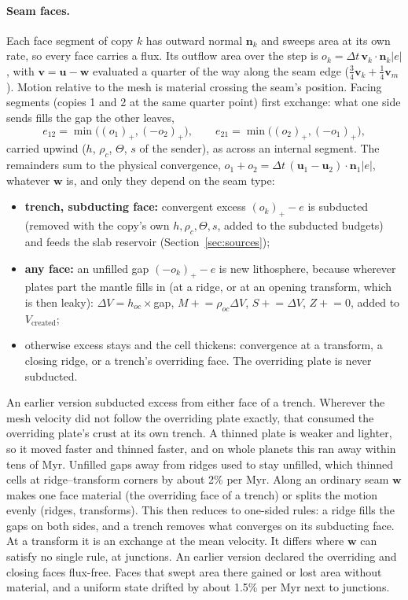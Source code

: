 \documentclass[11pt]{article}
\newcommand{\vect}[1]{\mathbf{#1}}
\begin{document}
\paragraph{Seam faces.} Each face segment of copy $k$ has outward normal $\vect{n}_k$ and sweeps area at its own rate, so every face carries a flux. Its outflow area over the step is $o_k=\Delta t\,\vect{v}_k\cdot\vect{n}_k|e|$, with $\vect{v}=\vect{u}-\vect{w}$ evaluated a quarter of the way along the seam edge ($\tfrac34\vect{v}_k+\tfrac14\vect{v}_m$). Motion relative to the mesh is material crossing the seam's position. Facing segments (copies 1 and 2 at the same quarter point) first exchange: what one side sends fills the gap the other leaves,
\begin{equation}
  e_{12}=\min\big((o_1)_+,(-o_2)_+\big),\qquad e_{21}=\min\big((o_2)_+,(-o_1)_+\big),
\end{equation}
carried upwind ($h$, $\rho_c$, $\Theta$, $s$ of the sender), as across an internal segment. The remainders sum to the physical convergence, $o_1+o_2=\Delta t\,(\vect{u}_1-\vect{u}_2)\cdot\vect{n}_1|e|$, whatever $\vect{w}$ is, and only they depend on the seam type:
\begin{itemize}
\item \textbf{trench, subducting face:} convergent excess $(o_k)_+-e$ is subducted (removed with the copy's own $h,\rho_c,\Theta,s$, added to the subducted budgets) and feeds the slab reservoir (Section~\ref{sec:sources});
\item \textbf{any face:} an unfilled gap $(-o_k)_+-e$ is new lithosphere, because wherever plates part the mantle fills in (at a ridge, or at an opening transform, which is then leaky): $\Delta V=h_{oc}\times$gap, $M\mathrel{+}=\rho_{oc}\Delta V$, $S\mathrel{+}=\Delta V$, $Z\mathrel{+}=0$, added to $V_{\mathrm{created}}$;
\item otherwise excess stays and the cell thickens: convergence at a transform, a closing ridge, or a trench's overriding face. The overriding plate is never subducted.
\end{itemize}
An earlier version subducted excess from either face of a trench. Wherever the mesh velocity did not follow the overriding plate exactly, that consumed the overriding plate's crust at its own trench. A thinned plate is weaker and lighter, so it moved faster and thinned faster, and on whole planets this ran away within tens of Myr. Unfilled gaps away from ridges used to stay unfilled, which thinned cells at ridge--transform corners by about 2\% per Myr.
Along an ordinary seam $\vect{w}$ makes one face material (the overriding face of a trench) or splits the motion evenly (ridges, transforms). This then reduces to one-sided rules: a ridge fills the gaps on both sides, and a trench removes what converges on its subducting face. At a transform it is an exchange at the mean velocity. It differs where $\vect{w}$ can satisfy no single rule, at junctions. An earlier version declared the overriding and closing faces flux-free. Faces that swept area there gained or lost area without material, and a uniform state drifted by about 1.5\% per Myr next to junctions.
\end{document}
